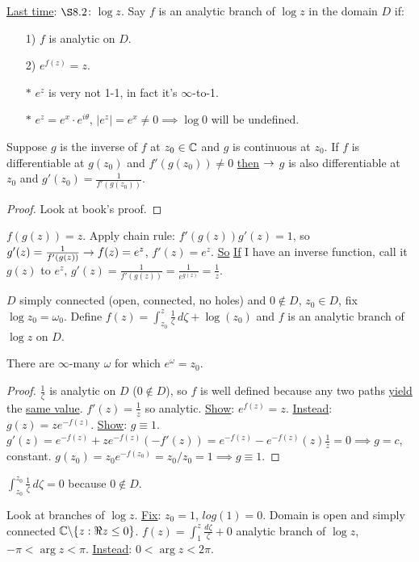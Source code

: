 \documentclass[]{article}
\begin{document}
\underline{Last time}: $\S8.2$: $\log{z}$. Say $f$ is an analytic branch of $\log{z}$ in the domain $D$ if: 
\begin{enumerate}
	\item[1)] $f$ is analytic on $D$.
	\item[2)] $e^{f(z)} = z$.
\end{enumerate}
\begin{enumerate}
	\item[$*$] $e^z$ is very not 1-1, in fact it's $\infty$-to-1.
	\item[$*$] $e^z = e^x\cdot e^{i\theta}$, $|e^z| = e^x \neq 0 \implies \log{0}$ will be undefined.
\end{enumerate}
\begin{theorem}
	Suppose $g$ is the inverse of $f$ at $z_0 \in \mathbb{C}$ and $g$ is continuous at $z_0$. If $f$ is differentiable at $g(z_0)$ and $f'(g(z_0)) \neq 0$ \underline{then} $\rightarrow$ $g$ is also differentiable at $z_0$ and $g'(z_0) = \frac{1}{f'(g(z_0))}$.
\end{theorem}
\begin{proof}
	Look at book's proof.
\end{proof}
\begin{definition}
	 $f(g(z)) = z$. Apply chain rule: $f'(g(z))g'(z) = 1$, so $g'(z) = \frac{1}{f'(g(z))} \rightarrow f(z) = e^z$, $f'(z) = e^z$. \underline{So} \underline{If} I have an inverse function, call it $g(z)$ to $e^z$, $g'(z) = \frac{1}{f'(g(z))} = \frac{1}{e^{g(z)}} = \frac{1}{z}$.
\end{definition}
\begin{theorem}
	$D$ simply connected (open, connected, no holes) and $0\notin D$, $z_0\in D$, fix $\log{z_0} = \omega_0$. Define $f(z) = \int_{z_0}^z \frac{1}{\zeta} \, d\zeta + \log(z_0)$ and $f$ is an analytic branch of $\log{z}$ on $D$.
\end{theorem}
\begin{note}
	There are $\infty$-many $\omega$ for which $e^\omega = z_0$.
\end{note}
\begin{proof}
	$\frac{1}{\zeta}$ is analytic on $D$ ($0\notin D$), so $f$ is well defined because any two paths \underline{yield} the \underline{same value}. $f'(z) = \frac{1}{z}$ so analytic. \underline{Show}: $e^{f(z)} = z$. \underline{Instead}: $g(z) = ze^{-f(z)}$. \underline{Show}: $g\equiv 1$. $g'(z) = e^{-f(z)} + ze^{-f(z)} (-f'(z)) = e^{-f(z)} - e^{-f(z)}(z)\frac{1}{z} = 0 \implies g = c$, constant. $g(z_0) = z_0 e^{-f(z_0)} = z_0/z_0 = 1 \implies g\equiv 1$.
\end{proof}
\begin{remark}
	$\int_{z_0}^{z_0} \frac{1}{\zeta} \, d\zeta = 0$ because $0\notin D$.
\end{remark}
Look at branches of $\log{z}$. \underline{Fix}: $z_0 =1$, $log{(1)} = 0$. Domain is open and simply connected $\mathbb{C}\backslash \{z: \Re z \leq 0\}$. $f(z) = \int_1^z \frac{d\zeta}{\zeta} + 0$ analytic branch of $\log{z}$, $-\pi<\arg{z}<\pi$. \underline{Instead}: $0<\arg{z} <2\pi$.
\end{document}
